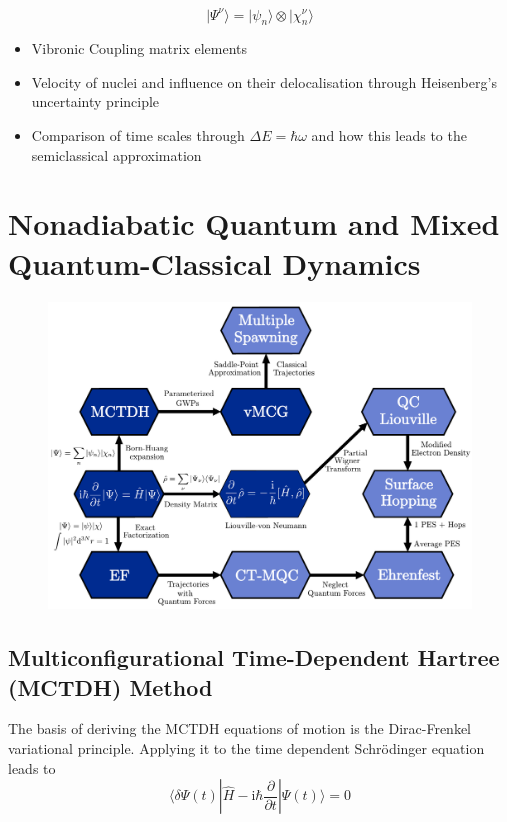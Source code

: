 \documentclass[9pt]{report}
\begin{document}
\begin{equation}
\big|\Psi^{\nu}\big\rangle = \big|\psi_{n}\big\rangle\otimes\big|\chi_{n}^{\nu}\big\rangle
\end{equation}
\begin{itemize}
	\item Vibronic Coupling matrix elements
	\item Velocity of nuclei and influence on their delocalisation through Heisenberg's uncertainty principle
	\item Comparison of time scales through $\Delta E = \hbar\omega$ and how this leads to the semiclassical approximation
\end{itemize}



\newpage
\section{Nonadiabatic Quantum and Mixed Quantum-Classical Dynamics}

\begin{figure}[H]
	\centering
	\includegraphics[width=15cm]{MQC_Algorithms.pdf}
\end{figure}




\subsection{Multiconfigurational Time-Dependent Hartree (MCTDH) Method}
The basis of deriving the MCTDH equations of motion is the Dirac-Frenkel variational principle. Applying it to the time dependent Schrödinger equation leads to
\begin{equation}
\langle\delta\Psi(t)|\hat{H}-\mathrm{i}\hbar\frac{\partial}{\partial t}|\Psi(t)\rangle = 0
\end{equation}
\end{document}
